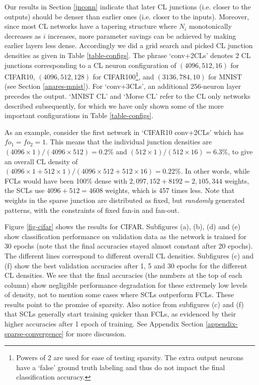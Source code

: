 \documentclass[conference]{IEEEtran}
\begin{document}
Our results in Section \ref{jnconn} indicate that later CL junctions (i.e. closer to the outputs) should be denser than earlier ones (i.e. closer to the inputs). Moreover, since most CL networks have a tapering structure where $N_i$ monotonically decreases as $i$ increases, more parameter savings can be achieved by making earlier layers less dense. Accordingly we did a grid search and picked CL junction densities as given in Table \ref{table-configs}. The phrase `conv+2CLs' denotes 2 CL junctions corresponding to a CL neuron configuration of $(4096,512,16)$ for CIFAR10, $(4096,512,128)$ for 
CIFAR100\footnote{Powers of 2 are used for ease of testing sparsity. The extra output neurons have a `false' ground truth labeling and thus do not impact the final classification accuracy.}, and $(3136,784,10)$ for MNIST (see Section \ref{anares-mnist}). For `conv+3CLs', an additional 256-neuron layer precedes the output. `MNIST CL' and `Morse CL' refer to the CL only networks described subsequently, for which we have only shown some of the more important configurations in Table \ref{table-configs}.

As an example, consider the first network in `CIFAR10 conv+2CLs' which has $fo_1 = fo_2 = 1$. This means that the individual junction densities are $(4096\times1)/(4096\times512) = 0.2\%$ and $(512\times1)/(512\times16) = 6.3\%$, to give an overall CL density of $(4096\times1+512\times1)/(4096\times512+512\times16) = 0.22\%$. In other words, while FCLs would have been 100\% dense with $2,097,152+8192 = 2,105,344$ weights, the SCLs use $4096+512 = 4608$ weights, which is 457 times less. Note that weights in the sparse junction are distributed as fixed, but \emph{randomly} generated patterns, with the constraints of fixed fan-in and fan-out.  

Figure \ref{fig-cifar} shows the results for CIFAR. Subfigures (a), (b), (d) and (e) show classification performance on validation data as the network is trained for 30 epochs (note that the final accuracies stayed almost constant after 20 epochs). The different lines correspond to different overall CL densities. Subfigures (c) and (f) show the best validation accuracies after 1, 5 and 30 epochs for the different CL densities. We see that the final accuracies (the numbers at the top of each column) show negligible performance degradation for these extremely low levels of density, not to mention some cases where SCLs outperform FCLs. These results point to the promise of sparsity. Also notice from subfigures (c) and (f) that SCLs generally start training quicker than FCLs, as evidenced by their higher accuracies after 1 epoch of training. See Appendix Section \ref{appendix-sparse-convergence} for more discussion. %
\end{document}
